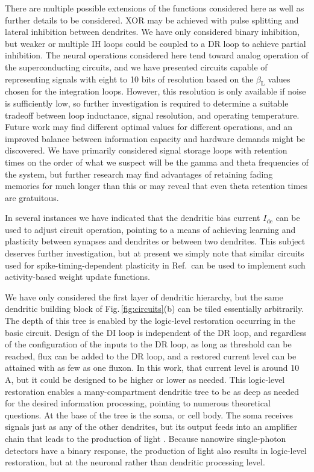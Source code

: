 \documentclass[twocolumn]{article}
\newcommand{\onlinecite}[1]{\hspace{-1 ex} \nocite{#1}\citenum{#1}}
\begin{document}
There are multiple possible extensions of the functions considered here as well as further details to be considered. XOR may be achieved with pulse splitting and lateral inhibition between dendrites. We have only considered binary inhibition, but weaker or multiple IH loops could be coupled to a DR loop to achieve partial inhibition. The neural operations considered here tend toward analog operation of the superconducting circuits, and we have presented circuits capable of representing signals with eight to 10 bits of resolution based on the $\beta_{\mathrm{L}}$ values chosen for the integration loops. However, this resolution is only available if noise is sufficiently low, so further investigation is required to determine a suitable tradeoff between loop inductance, signal resolution, and operating temperature. Future work may find different optimal values for different operations, and an improved balance between information capacity and hardware demands might be discovered. We have primarily considered signal storage loops with retention times on the order of what we suspect will be the gamma and theta frequencies of the system, but further research may find advantages of retaining fading memories for much longer than this or may reveal that even theta retention times are gratuitous. 

In several instances we have indicated that the dendritic bias current $I_{\mathrm{de}}$ can be used to adjust circuit operation, pointing to a means of achieving learning and plasticity between synapses and dendrites \cite{haah2015} or between two dendrites. This subject deserves further investigation, but at present we simply note that similar circuits used for spike-timing-dependent plasticity in Ref.\,\onlinecite{sh2018_full} can be used to implement such activity-based weight update functions. 

We have only considered the first layer of dendritic hierarchy, but the same dendritic building block of Fig.\,\ref{fig:circuits}(b) can be tiled essentially arbitrarily. The depth of this tree is enabled by the logic-level restoration occurring in the basic circuit. Design of the DI loop is independent of the DR loop, and regardless of the configuration of the inputs to the DR loop, as long as threshold can be reached, flux can be added to the DR loop, and a restored current level can be attained with as few as one fluxon. In this work, that current level is around 10\,\textmu A, but it could be designed to be higher or lower as needed. This logic-level restoration enables a many-compartment dendritic tree to be as deep as needed for the desired information processing, pointing to numerous theoretical questions. At the base of the tree is the soma, or cell body. The soma receives signals just as any of the other dendrites, but its output feeds into an amplifier chain that leads to the production of light \cite{sh2018_full}. Because nanowire single-photon detectors have a binary response, the production of light also results in logic-level restoration, but at the neuronal rather than dendritic processing level.
\end{document}
